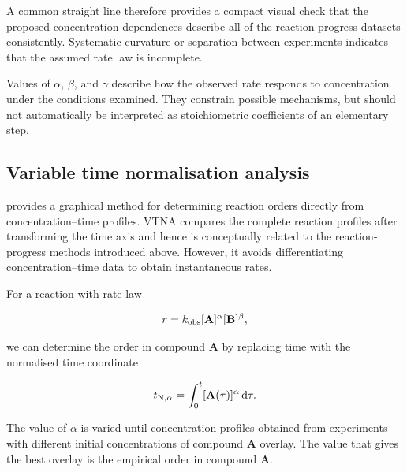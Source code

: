A common straight line therefore provides a compact visual check that the proposed concentration dependences describe all of the reaction-progress datasets consistently.
Systematic curvature or separation between experiments indicates that the assumed rate law is incomplete.

\begin{conceptbox}
  Values of $\alpha$, $\beta$, and $\gamma$ describe how the observed rate responds to concentration under the conditions examined.
  They constrain possible mechanisms, but should not automatically be interpreted as stoichiometric coefficients of an elementary step.
\end{conceptbox}

\subsection{Variable time normalisation analysis}

 provides a graphical method for determining reaction orders directly from concentration--time profiles.
VTNA compares the complete reaction profiles after transforming the time axis and hence is conceptually related to the reaction-progress methods introduced above.
However, it avoids differentiating concentration--time data to obtain instantaneous rates.

For a reaction with rate law

\begin{equation}
  r = k_{\mathrm{obs}}
      [\text{\textbf{A}}]^{\alpha}
      [\text{\textbf{B}}]^{\beta},
\end{equation}

we can determine the order in compound \textbf{A} by replacing time with the normalised time coordinate

  \begin{equation}
    t_{\mathrm{N},\alpha}
    = \int_0^t [\text{\textbf{A}}(\tau)]^{\alpha}\,\mathrm{d}\tau.
  \end{equation}

The value of $\alpha$ is varied until concentration profiles obtained from experiments with different initial concentrations of compound \textbf{A} overlay.
The value that gives the best overlay is the empirical order in compound \textbf{A}.

